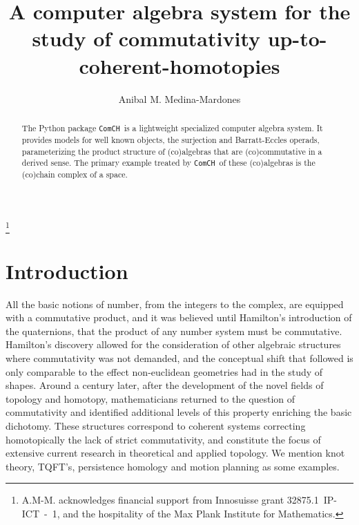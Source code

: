 \documentclass{amsart}
\newcommand{\comch}{\texttt{ComCH}}
\begin{document}
\title[A C.A.S. for the study of commutativity up-to-coherent-homotopies]{A computer algebra system for the study of commutativity up-to-coherent-homotopies}
\author{Anibal M. Medina-Mardones}
\address{Max Plank Institute for Mathematics, Bonn, Germany}
\address{Department of Mathematics, University of Notre Dame, Notre Dame, IN, USA}
\thanks{A.M-M. acknowledges financial support from Innosuisse grant \mbox{32875.1 IP-ICT - 1}, and the hospitality of the Max Plank Institute for Mathematics.}

\begin{abstract}
	The Python package \comch\, is a lightweight specialized computer algebra system. It provides models for well known objects, the surjection and Barratt-Eccles operads, parameterizing the product structure of (co)algebras that are (co)commutative in a derived sense. The primary example treated by \comch\, of these (co)algebras is the (co)chain complex of a space.
\end{abstract} 

\maketitle

\section{Introduction}

All the basic notions of number, from the integers to the complex, are equipped with a commutative product, and it was believed until Hamilton's introduction of the quaternions, that the product of any number system must be commutative. Hamilton's discovery allowed for the consideration of other algebraic structures where commutativity was not demanded, and the conceptual shift that followed is only comparable to the effect non-euclidean geometries had in the study of shapes. Around a century later, after the development of the novel fields of topology and homotopy, mathematicians returned to the question of commutativity and identified additional levels of this property enriching the basic dichotomy. These structures correspond to coherent systems correcting homotopically the lack of strict commutativity, and constitute the focus of extensive current research in theoretical and applied topology. We mention knot theory, TQFT's, persistence homology and motion planning as some examples.
\end{document}
